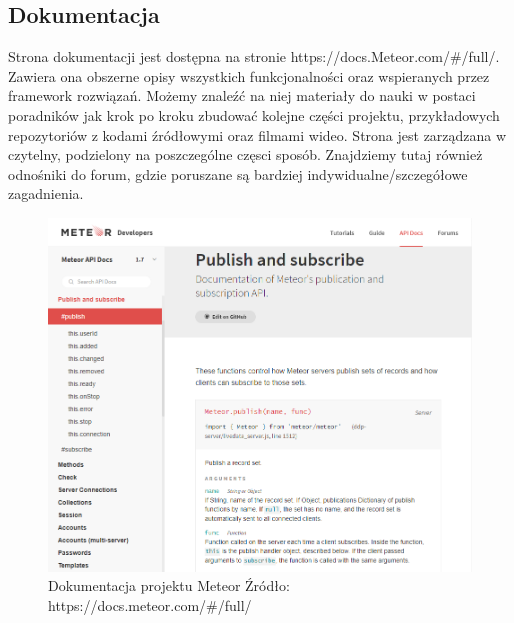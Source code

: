 \documentclass[12pt]{report}
\begin{document}
    \subsection{Dokumentacja}
      Strona dokumentacji jest dostępna na stronie https://docs.Meteor.com/\#/full/.
      Zawiera ona obszerne opisy wszystkich funkcjonalności oraz wspieranych przez framework rozwiązań.
      Możemy znaleźć na niej materiały do nauki w postaci poradników jak krok po kroku zbudować kolejne części projektu, przykładowych repozytoriów z kodami źródłowymi oraz filmami wideo.
      Strona jest zarządzana w czytelny, podzielony na poszczególne częsci sposób.
      Znajdziemy tutaj również odnośniki do forum, gdzie poruszane są bardziej indywidualne/szczegółowe zagadnienia.
      \pagebreak
      \begin{figure}[!hb]
        \centering
        \includegraphics[width=\textwidth,height=\textheight,keepaspectratio]{doc_meteor.png} 
        \caption{Dokumentacja projektu Meteor \newline Źródło: https://docs.meteor.com/\#/full/}
      \end{figure}
\end{document}
